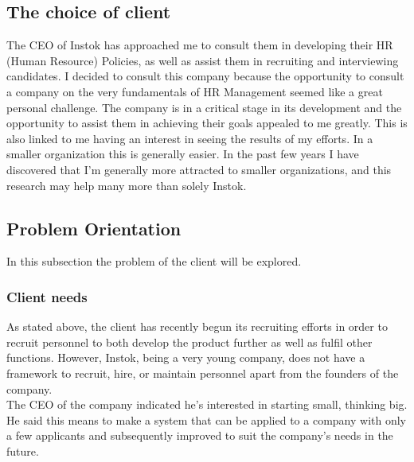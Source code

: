 \documentclass[man]{apa6}
\begin{document}
\subsection{The choice of client}
The CEO of Instok has approached me to consult them in developing their HR (Human Resource) Policies, as well as assist them in recruiting and interviewing candidates. I decided to consult this company because the opportunity to consult a company on the very fundamentals of HR Management seemed like a great personal challenge. The company is in a critical stage in its development and the opportunity to assist them in achieving their goals appealed to me greatly. This is also linked to me having an interest in seeing the results of my efforts. In a smaller organization this is generally easier. In the past few years I have discovered that I'm generally more attracted to smaller organizations, and this research may help many more than solely Instok.

\subsection{Problem Orientation}
In this subsection the problem of the client will be explored.\\

\subsubsection{Client needs}
As stated above, the client has recently begun its recruiting efforts in order to recruit personnel to both develop the product further as well as fulfil other functions. However, Instok, being a very young company, does not have a framework to recruit, hire, or maintain personnel apart from the founders of the company. \\
The CEO of the company indicated he's interested in starting small, thinking big. He said this means to make a system that can be applied to a company with only a few applicants and subsequently improved to suit the company's needs in the future.
\end{document}
